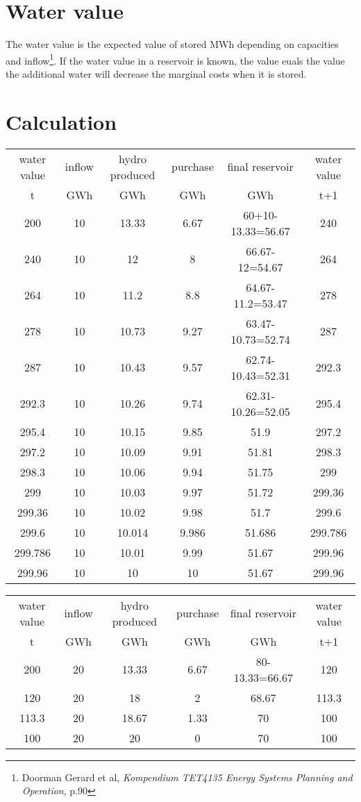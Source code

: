 \documentclass{article}
\begin{document}
\section{Water value}
The water value is the expected value of stored MWh depending on capacities and inflow\footnote{Doorman Gerard et al, \textit{Kompendium TET4135 Energy Systems Planning and Operation}, p.90}. If the water value in a reservoir is known, the value euals the value the additional water will decrease the marginal costs when it is stored.
\section{Calculation}
\begin{center}
\begin{tabular}{|c|c|c|c|c|c|}
\hline
water value & inflow & hydro produced & purchase & final reservoir	& water value\\
    t       &  GWh   &    GWh         &     GWh       &     GWh         & t+1 \\
\hline
\hline
200 & 10 & 13.33 & 6.67 & 60+10-13.33=56.67 & 240\\
240 & 10 & 12 & 8 & 66.67-12=54.67 & 264\\
264 & 10 & 11.2 & 8.8 & 64.67-11.2=53.47 & 278\\
278 & 10 & 10.73 & 9.27 & 63.47-10.73=52.74 & 287\\
287 & 10 & 10.43 & 9.57 & 62.74-10.43=52.31 & 292.3\\
292.3 & 10 & 10.26 & 9.74 & 62.31-10.26=52.05 & 295.4\\
295.4 & 10 & 10.15 & 9.85 & 51.9 & 297.2\\
297.2 & 10 & 10.09 & 9.91 & 51.81 & 298.3\\
298.3 & 10 & 10.06 & 9.94 & 51.75 & 299\\
299 & 10 & 10.03 & 9.97 & 51.72 & 299.36\\
299.36 & 10 & 10.02 & 9.98 & 51.7 & 299.6\\
299.6 & 10 & 10.014 & 9.986 & 51.686 & 299.786\\
299.786 & 10 & 10.01 & 9.99 & 51.67 & 299.96\\
\hline
299.96 & 10 & 10 & 10 & 51.67 & 299.96\\
\hline
\end{tabular}
\end{center}


\begin{center}
\begin{tabular}{|c|c|c|c|c|c|}
\hline
water value & inflow & hydro produced & purchase & final reservoir	& water value\\
    t       &  GWh   &    GWh         &     GWh       &     GWh         & t+1 \\
\hline
\hline
200 & 20 & 13.33 & 6.67 & 80-13.33=66.67 & 120\\
120 & 20 & 18 & 2 & 68.67 & 113.3\\
113.3 & 20 & 18.67 & 1.33 & 70 & 100\\
\hline
100 & 20 & 20 & 0 & 70 & 100\\
\hline
\end{tabular}
\end{center}
\end{document}

